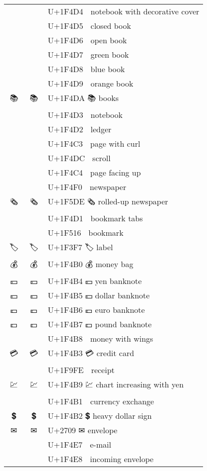 \documentclass[a4paper,12pt]{article}
\newcommand{\fontA}[1]{{\fontspec[RawFeature={mode=harf,+dist,+ccmp}]{Segoe UI Emoji} #1}}
\newcommand{\fontB}[1]{{\fontspec[RawFeature={mode=harf,+dist,+ccmp}]{Noto Color Emoji} #1}}
\begin{document}
\begin{longtable}[c]{ccp{0.8\linewidth}}
\fontA{📔}&\fontB{📔}&U+1F4D4 📔 notebook with decorative cover\\
\fontA{📕}&\fontB{📕}&U+1F4D5 📕 closed book\\
\fontA{📖}&\fontB{📖}&U+1F4D6 📖 open book\\
\fontA{📗}&\fontB{📗}&U+1F4D7 📗 green book\\
\fontA{📘}&\fontB{📘}&U+1F4D8 📘 blue book\\
\fontA{📙}&\fontB{📙}&U+1F4D9 📙 orange book\\
\fontA{📚}&\fontB{📚}&U+1F4DA 📚 books\\
\fontA{📓}&\fontB{📓}&U+1F4D3 📓 notebook\\
\fontA{📒}&\fontB{📒}&U+1F4D2 📒 ledger\\
\fontA{📃}&\fontB{📃}&U+1F4C3 📃 page with curl\\
\fontA{📜}&\fontB{📜}&U+1F4DC 📜 scroll\\
\fontA{📄}&\fontB{📄}&U+1F4C4 📄 page facing up\\
\fontA{📰}&\fontB{📰}&U+1F4F0 📰 newspaper\\
\fontA{🗞}&\fontB{🗞}&U+1F5DE 🗞 rolled-up newspaper\\
\fontA{📑}&\fontB{📑}&U+1F4D1 📑 bookmark tabs\\
\fontA{🔖}&\fontB{🔖}&U+1F516 🔖 bookmark\\
\fontA{🏷}&\fontB{🏷}&U+1F3F7 🏷 label\\
\fontA{💰}&\fontB{💰}&U+1F4B0 💰 money bag\\
\fontA{💴}&\fontB{💴}&U+1F4B4 💴 yen banknote\\
\fontA{💵}&\fontB{💵}&U+1F4B5 💵 dollar banknote\\
\fontA{💶}&\fontB{💶}&U+1F4B6 💶 euro banknote\\
\fontA{💷}&\fontB{💷}&U+1F4B7 💷 pound banknote\\
\fontA{💸}&\fontB{💸}&U+1F4B8 💸 money with wings\\
\fontA{💳}&\fontB{💳}&U+1F4B3 💳 credit card\\
\fontA{🧾}&\fontB{🧾}&U+1F9FE 🧾 receipt\\
\fontA{💹}&\fontB{💹}&U+1F4B9 💹 chart increasing with yen\\
\fontA{💱}&\fontB{💱}&U+1F4B1 💱 currency exchange\\
\fontA{💲}&\fontB{💲}&U+1F4B2 💲 heavy dollar sign\\
\fontA{✉}&\fontB{✉}&U+2709 ✉ envelope\\
\fontA{📧}&\fontB{📧}&U+1F4E7 📧 e-mail\\
\fontA{📨}&\fontB{📨}&U+1F4E8 📨 incoming envelope\\

\end{longtable}
\end{document}
